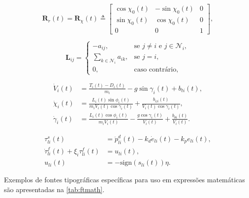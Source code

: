 \begin{equation}\label{eq:R_f_usual}
\mathbf{R}_r(t) = \mathbf{R}_{\chi}(t) \triangleq 
\begin{bmatrix}
\cos \chi_0 (t) & -\sin \chi_0 (t) & 0
\\
\sin \chi_0 (t) & \cos \chi_0 (t) & 0
\\
0 & 0 & 1
\end{bmatrix},
\end{equation}

\begin{equation}
\mathbf{L}_{ij} = 
\begin{cases}
-a_{ij}, & \textrm{se } j \neq i \textrm{ e } j \in \mathcal{N}_i, \\
\sum_{k \in \mathcal{N}_i} a_{ik}, & \textrm{se } j = i,  \\
0, & \textrm{caso contrário},
\end{cases}
\end{equation}

\begin{equation}\label{eq:point-mass-velocity}
\begin{split}
\dot{V}_{i}(t) &{}= \frac{T_{i}(t) - D_i(t)}{m_i} - g \sin \gamma_{i}(t) + b_{ti}(t), \\
\dot{\chi}_i(t) &{}= \frac{L_i(t) \sin \phi_i(t)}{m_i V_{i}(t) \cos \gamma_{i}(t)} + \frac{b_{\psi i}(t)}{V_{i}(t)\cos \gamma_{i}(t)}, \\
\dot{\gamma}_{i}(t) &{}= \frac{L_i(t) \cos \phi_i(t)}{m_i V_{i}(t)} - \frac{g \cos \gamma_{i}(t)}{V_{i}(t)} + \frac{b_{\theta i}(t)}{V_{i}(t)}.
\end{split}
\end{equation}


\begin{subequations}
\begin{align}
\tau_{li}^s(t) &= \ddot{p}^d_{li}(t) - k_{d} \dot{e}_{li}(t) - k_{p} e_{li}(t), \\
\dot{\tau}_{li}^f(t) +  \xi_{i} \tau_{li}^f(t) &= u_{li}(t),\label{eq:filtro_i} \\
u_{li}(t) &= - \textrm{sign}(s_{li}(t))\eta. \label{eq:u_xbi}
\end{align}
\end{subequations}

Exemplos de fontes tipográficas específicas para uso em expressões matemáticas são apresentadas na \cref{tab:ftmath}.


